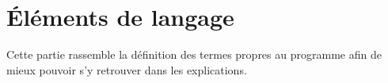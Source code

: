 \chapter{Éléments de langage}\label{cha:elements_de_langage}

Cette partie rassemble la définition des termes propres au programme afin de mieux pouvoir s'y retrouver dans les explications.
